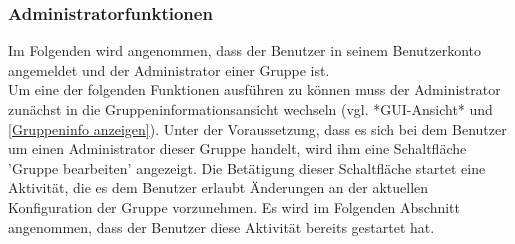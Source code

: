 \documentclass[parskip=full]{scrartcl}
\begin{document}
\subsubsection{Administratorfunktionen}
Im Folgenden wird angenommen, dass der Benutzer in seinem Benutzerkonto angemeldet und der Administrator einer Gruppe ist.\\
Um eine der folgenden Funktionen ausführen zu können muss der Administrator zunächst in die Gruppeninformationsansicht wechseln (vgl. *GUI-Ansicht* und \ref{Gruppeninfo anzeigen}). Unter der Voraussetzung, dass es sich bei dem Benutzer um einen Administrator dieser Gruppe handelt, wird ihm eine Schaltfläche 'Gruppe bearbeiten' angezeigt. Die Betätigung dieser Schaltfläche startet eine Aktivität, die es dem Benutzer erlaubt Änderungen an der aktuellen Konfiguration der Gruppe vorzunehmen. Es wird im Folgenden Abschnitt angenommen, dass der Benutzer diese Aktivität bereits gestartet hat.
\end{document}
